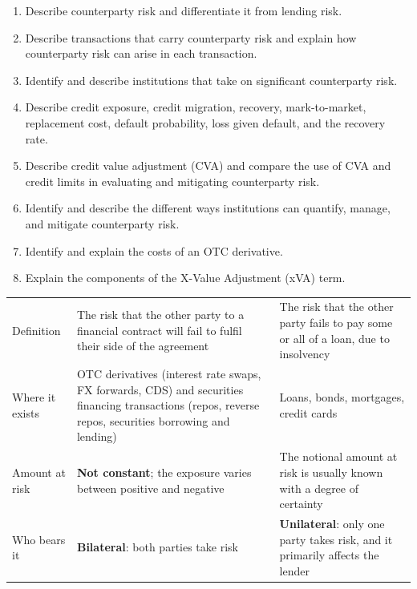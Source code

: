 
\begin{crkeybox}
\begin{enumerate}[label=\textbf{\alph*.},leftmargin=2em]
\item Describe counterparty risk and differentiate it from lending risk.
\item Describe transactions that carry counterparty risk and explain how counterparty risk can arise in each transaction.
\item Identify and describe institutions that take on significant counterparty risk.
\item Describe credit exposure, credit migration, recovery, mark-to-market, replacement cost, default probability, loss given default, and the recovery rate.
\item Describe credit value adjustment (CVA) and compare the use of CVA and credit limits in evaluating and mitigating counterparty risk.
\item Identify and describe the different ways institutions can quantify, manage, and mitigate counterparty risk.
\item Identify and explain the costs of an OTC derivative.
\item Explain the components of the X-Value Adjustment (xVA) term.
\end{enumerate}
\end{crkeybox}


\begin{center}
\footnotesize
\begin{tabular}{L{2.7cm} L{5.8cm} L{6.0cm}}
\toprule
 &  &  \\
\midrule
Definition & The risk that the other party to a financial contract will fail to
  fulfil their side of the agreement &
  The risk that the other party fails to pay some or all of a loan, due to
  insolvency \\
Where it exists & OTC derivatives (interest rate swaps, FX forwards, CDS) and
  securities financing transactions (repos, reverse repos, securities borrowing
  and lending) &
  Loans, bonds, mortgages, credit cards \\
Amount at risk & \textbf{Not constant}; the exposure varies between positive and
  negative &
  The notional amount at risk is usually known with a degree of certainty \\
Who bears it & \textbf{Bilateral}: both parties take risk &
  \textbf{Unilateral}: only one party takes risk, and it primarily affects the
  lender \\
\bottomrule
\end{tabular}
\end{center}

